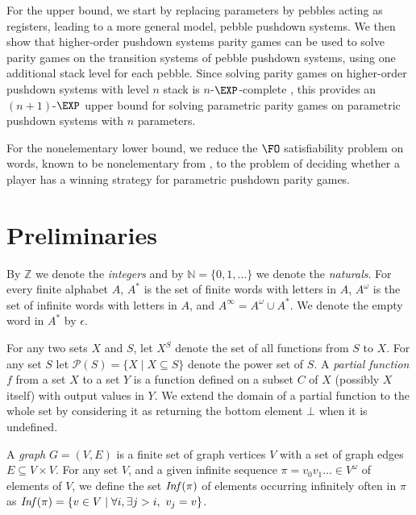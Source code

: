 \documentclass[a4paper,UKenglish,cleveref, autoref, thm-restate]{lipics-v2021}
\newcommand{\Z}{\mathbb{Z}}
\newcommand{\N}{\mathbb{N}}
\newcommand{\MSO}{\textsc{MSO}}
\begin{document}
	For the upper bound, we start by replacing parameters by pebbles acting as registers, leading to a more general model, pebble pushdown systems.
 We then show that higher-order pushdown systems parity games can be used to solve parity games on
 the transition systems of pebble pushdown systems,
using one additional stack level for each pebble.
 Since solving parity games on higher-order pushdown systems with level $n$ stack is $n$-$\EXP$-complete \cite{ Cach03, cachat2007complexity}, this provides an $(n+1)$-$\EXP$ upper bound for solving parametric parity games on parametric pushdown systems with $n$ parameters.

	For the nonelementary lower bound,
we reduce the $\FO$ satisfiability problem on words, known to be nonelementary
from \cite{Sto74}, to the
problem of deciding whether a player has a winning strategy for parametric pushdown parity games. 





\section{Preliminaries}


\newcommand{\LCM}{\mathsf{LCM}}
\newcommand{\LOGSPACE}{\mathsf{LOGSPACE}}
\renewcommand{\MSO}{\mathsf{MSO}}
\newcommand{\SO}{\mathsf{SO}}

By $\Z $ we denote the {\em integers} and by $\N=\{0,1,\ldots\}$ we denote the {\em naturals}.
For every finite alphabet $A$, $A^*$ is the set of finite
words with letters in  $A$, $A^\omega$ is the set of infinite words with letters in $A$, and
 $A^\infty = A^\omega \cup A^*$. We denote the empty word in $A^*$ by $\epsilon$.


 For any two sets $X$ and $S$, let $X^S$ denote the set of all functions from $S$ to $X$.
For any set $S$ let 
$\mathcal{P}(S) = \{ X \mid X \subseteq S \}$
denote the power set of $S$.
%
A {\em partial function} $f$ from a set $X$ to a set $Y$ is a function defined on a subset $C$ of $X$ (possibly $X$ itself) with output values in $Y$. We extend the domain of a partial function to the whole set
by considering it as returning the bottom element $\bot$ when it is undefined.




A {\em graph} $G=(V,E)$ is a finite set of graph vertices $V$ with a set of graph edges $E \subseteq V \times V$. 
For any set $V$, and a given infinite sequence $\pi = v_0 v_1 \ldots \in V^\omega$ of elements of $V$, we define the set 
$\text{\textit{Inf}}(\pi)$ of elements occurring infinitely often in $\pi$ as
$\text{\textit{Inf}}(\pi) = \{ v \in V \mid \forall i, \exists j > i, ~ v_j = v \}$. 
\end{document}
